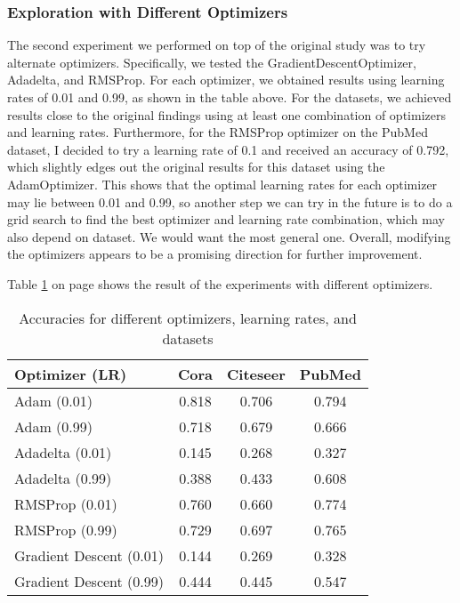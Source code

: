 \documentclass[11pt,a4paper]{article}
\begin{document}
\subsubsection{Exploration with Different Optimizers}

The second experiment we performed on top of the original study was to try alternate optimizers. Specifically, we tested the GradientDescentOptimizer, Adadelta, and RMSProp. For each optimizer, we obtained results using learning rates of 0.01 and 0.99, as shown in the table above. For the datasets, we achieved results close to the original findings using at least one combination of optimizers and learning rates. Furthermore, for the RMSProp optimizer on the PubMed dataset, I decided to try a learning rate of 0.1 and received an accuracy of 0.792, which slightly edges out the original results for this dataset using the AdamOptimizer. This shows that the optimal learning rates for each optimizer may lie between 0.01 and 0.99, so another step we can try in the future is to do a grid search to find the best optimizer and learning rate combination, which may also depend on dataset. We would want the most general one. Overall, modifying the optimizers appears to be a promising direction for further improvement.

Table \ref{table:optimizers} on page \pageref{table:optimizers} shows the result of the experiments with different optimizers.

\begin{table}[h]
  \centering
  \begin{tabular}{p{2.3cm}|c|c|c}
  \textbf{Optimizer (LR)} & \textbf{Cora} & \textbf{Citeseer} & \textbf{PubMed} \\ \hline
  Adam (0.01)             & 0.818 & 0.706 & 0.794 \\
  Adam (0.99)             & 0.718 & 0.679 & 0.666 \\
  Adadelta (0.01)         & 0.145 & 0.268 & 0.327 \\
  Adadelta (0.99)         & 0.388 & 0.433 & 0.608 \\
  RMSProp (0.01)          & 0.760 & 0.660 & 0.774 \\
  RMSProp (0.99)          & 0.729 & 0.697 & 0.765 \\
  Gradient Descent (0.01) & 0.144 & 0.269 & 0.328 \\
  Gradient Descent (0.99) & 0.444 & 0.445 & 0.547
  \end{tabular}
  \caption{Accuracies for different optimizers, learning rates, and datasets}
  \label{table:optimizers}
\end{table}
\end{document}
